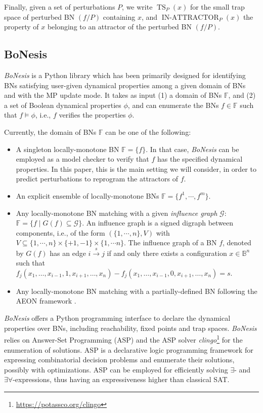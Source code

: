 \documentclass[PCJ,Unicode,screen,mode=plain]{cedram}
\begin{document}
Finally, given a set of perturbations \(P\), we write
\(\operatorname{TS}_P(x)\) for the small trap space of perturbed BN
\((f/P)\) containing \(x\), and \(\operatorname{IN-ATTRACTOR}_P(x)\) the
property of \(x\) belonging to an attractor of the perturbed BN
\((f/P)\).
\hypertarget{bonesis}{%
\subsection{BoNesis}\label{bonesis}}

\emph{BoNesis} is a Python library which has been primarily designed for identifying BNs satisfying
user-given dynamical properties among a given domain of BNs and with the MP update mode. It takes as
input (1) a domain of BNs
\(\mathbb F\), and (2) a set of Boolean dynamical properties \(\phi\),
and can enumerate the BNs \(f \in \mathbb F\) such that
\(f\models \phi\), i.e., \(f\) verifies the properties \(\phi\).

Currently, the domain of BNs \(\mathbb F\) can be one of the following:

\begin{itemize}
\item
  A singleton locally-monotone BN \(\mathbb F=\{f\}\). In that case,
  \emph{BoNesis} can be employed as a model checker to verify that \(f\)
  has the specified dynamical properties. In this paper, this is the
  main setting we will consider, in order to predict perturbations to
  reprogram the attractors of \(f\).
\item
  An explicit ensemble of locally-monotone BNs
  \(\mathbb F=\{ f^1,\cdots, f^m \}\).
\item
  Any locally-monotone BN matching with a given \emph{influence graph}
  \(\mathcal G\): \(\mathbb F = \{ f\mid G(f)\subseteq \mathcal G\}\).
  An influence graph is a signed digraph between components, i.e., of
  the form \((\{1,\cdots,n\},V)\) with
  \(V\subseteq \{1,\cdots,n\}\times \{+1,-1\}\times \{1,\cdots n\}\).
  The influence graph of a BN \(f\), denoted by \(G(f)\) has an edge
  \(i\xrightarrow{s} j\) if and only there exists a configuration
  \(x\in\mathbb B^n\) such that
  \(f_j(x_1, \ldots, x_{i-1}, 1, x_{i+1},\ldots, x_n) - f_j(x_1, \ldots, x_{i-1}, 0, x_{i+1},\ldots, x_n) = s\).
\item
  Any locally-monotone BN matching with a partially-defined BN following
  the AEON framework \citep{Benes2021}.
\end{itemize}

\emph{BoNesis} offers a Python programming interface to declare the
dynamical properties over BNs, including reachability, fixed points and
trap spaces. \emph{BoNesis} relies on Answer-Set Programming (ASP) and
the ASP solver \emph{clingo}\footnote{\url{https://potassco.org/clingo}} for the
enumeration of solutions. ASP is a declarative logic programming
framework for expressing combinatorial decision problems and enumerate
their solutions, possibly with optimizations. ASP can be employed for
efficiently solving \(\exists\)- and \(\exists\forall\)-expressions,
thus having an expressiveness higher than classical SAT.
\end{document}
